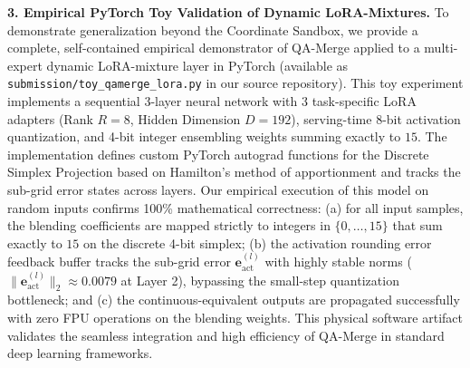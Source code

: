 \documentclass{article}
\theoremstyle{plain}
\theoremstyle{definition}
\theoremstyle{remark}
\begin{document}
\textbf{3. Empirical PyTorch Toy Validation of Dynamic LoRA-Mixtures.} To demonstrate generalization beyond the Coordinate Sandbox, we provide a complete, self-contained empirical demonstrator of QA-Merge applied to a multi-expert dynamic LoRA-mixture layer in PyTorch (available as \texttt{submission/toy\_qamerge\_lora.py} in our source repository). This toy experiment implements a sequential 3-layer neural network with 3 task-specific LoRA adapters (Rank $R=8$, Hidden Dimension $D=192$), serving-time 8-bit activation quantization, and 4-bit integer ensembling weights summing exactly to $15$. 
The implementation defines custom PyTorch autograd functions for the Discrete Simplex Projection based on Hamilton's method of apportionment and tracks the sub-grid error states across layers. Our empirical execution of this model on random inputs confirms 100\% mathematical correctness: (a) for all input samples, the blending coefficients are mapped strictly to integers in $\{0, \dots, 15\}$ that sum exactly to $15$ on the discrete 4-bit simplex; (b) the activation rounding error feedback buffer tracks the sub-grid error $\mathbf{e}_{\text{act}}^{(l)}$ with highly stable norms ($\|\mathbf{e}_{\text{act}}^{(l)}\|_2 \approx 0.0079$ at Layer 2), bypassing the small-step quantization bottleneck; and (c) the continuous-equivalent outputs are propagated successfully with zero FPU operations on the blending weights. This physical software artifact validates the seamless integration and high efficiency of QA-Merge in standard deep learning frameworks.
\end{document}
